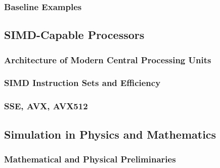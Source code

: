\documentclass{stdlocal}
\begin{document}
    \subsubsection*{Baseline Examples} %
    \label{ssub:baseline_examples}


  \subsection{SIMD-Capable Processors} %
  \label{sub:simd-capable_processors}
    \subsubsection*{Architecture of Modern Central Processing Units} %
    \label{ssub:architecture_of_modern_central_processing_units}


    \subsubsection*{SIMD Instruction Sets and Efficiency} %
    \label{ssub:simd_instruction_sets_and_efficiency}


    \subsubsection*{SSE, AVX, AVX512} %
    \label{ssub:sse_avx_avx512}


  \subsection{Simulation in Physics and Mathematics} %
  \label{sub:simulation_in_physics_and_mathematics}
    \subsubsection*{Mathematical and Physical Preliminaries} %
    \label{ssub:mathematical_and_physical_preliminaries}

\end{document}
